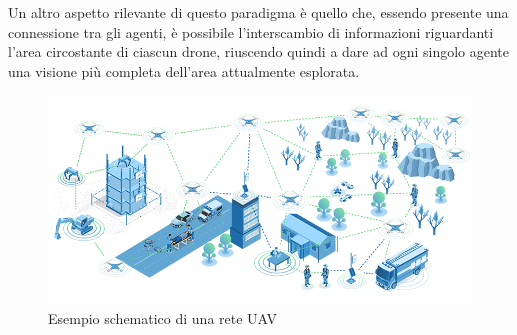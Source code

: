 Un altro aspetto rilevante di questo paradigma è quello che, essendo presente una connessione tra gli agenti, è possibile l'interscambio di informazioni riguardanti l'area circostante di ciascun drone, riuscendo quindi a dare ad ogni singolo agente una visione più completa dell'area attualmente esplorata.

\begin{figure}[t]
    \centering
    \includegraphics[width=1\textwidth]{img/ch1/uav_network_example.png}
    \caption{Esempio schematico di una rete UAV}
    \label{fig:esempio_rete_uav}
\end{figure}

